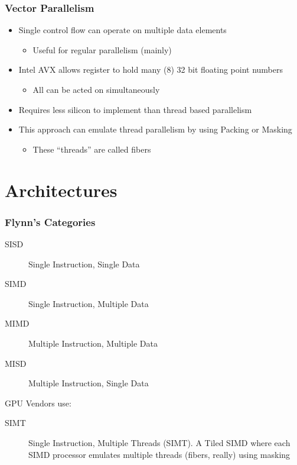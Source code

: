 \documentclass{beamer}
\begin{document}
\begin{frame}
	\frametitle{Vector Parallelism}
	\begin{itemize}
	\item Single control flow can operate on multiple data elements
	\begin{itemize}
	\item Useful for regular parallelism (mainly)
	\end{itemize}

\item Intel AVX allows register to hold many (8) 32 bit floating point numbers
	\begin{itemize}
	\item All can be acted on simultaneously
	\end{itemize}

\item Requires less silicon to implement than thread based parallelism
\item This approach can emulate thread parallelism by using Packing or Masking
	\begin{itemize}
	\item These “threads” are called fibers
	\end{itemize}

\end{itemize}
\end{frame}

\section{Architectures}
\begin{frame}
	\frametitle{Flynn's Categories}
	\begin{description}
	\item[SISD] Single Instruction, Single Data 
	\item[SIMD] Single Instruction, Multiple Data
	\item[MIMD] Multiple Instruction, Multiple Data
	\item[MISD] Multiple Instruction, Single Data
	\end{description}
GPU Vendors use:
	\begin{description}
	\item[SIMT] Single Instruction, Multiple Threads (SIMT).
A Tiled SIMD where each SIMD processor emulates multiple threads (fibers, really) using masking	
	\end{description}

	
\end{frame}
\end{document}
